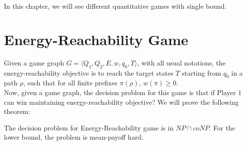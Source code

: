 In this chapter, we will see different quantitative games with single bound. \\

\section{Energy-Reachability Game}
Given a game graph $G=\langle Q_1, Q_2, E, w, q_0, T \rangle$, with all usual notations, the energy-reachability objective is to reach the target states $T$ starting from $q_0$ in a path $\rho$, such that for all finite prefixes $\pi(\rho)$, $w(\pi) \geq 0$.\\

Now, given a game graph, the decision problem for this game is that if Player $1$ can win maintaining energy-reachability objective? We will prove the following theorem:\\
\begin{theorem}
\label{energy-reach-thm}
The decision problem for Energy-Reachability game is in $NP \cap coNP$. For the lower bound, the problem is mean-payoff hard.
\end{theorem}
